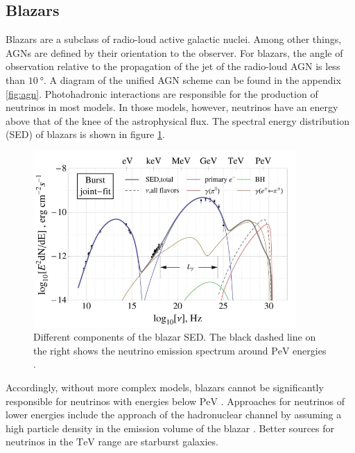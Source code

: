 \subsection{Blazars}
Blazars are a subclass of radio-loud active galactic nuclei.
Among other things, AGNs are defined by their orientation to the observer.
For blazars, the angle of observation relative to the propagation of the jet of the radio-loud AGN is less than $\SI{10}{\degree}$.
A diagram of the unified AGN scheme can be found in the appendix \ref{fig:agn}.
Photohadronic interactions are responsible for the production of neutrinos in most models.
In those models, however, neutrinos have an energy above that of the knee of the astrophysical flux.
The spectral energy distribution (SED) of blazars is shown in figure \ref{fig:sed}.
\begin{figure}
    \centering
    \includegraphics[width=10cm]{Plots/01_5_astroparticle/sed.jpeg}
    \caption{Different components of the blazar SED. The black dashed line on the right shows the neutrino emission spectrum around $\si{\peta\electronvolt}$ energies \cite{sed}.}
    \label{fig:sed}
\end{figure}
Accordingly, without more complex models, blazars cannot be significantly responsible for neutrinos with energies below $\si{\peta\electronvolt}$ \cite{blazar}.
Approaches for neutrinos of lower energies include the approach of the hadronuclear channel by assuming a high particle density in the emission volume of the blazar \cite{eichmann}.
Better sources for neutrinos in the $\si{\tera\electronvolt}$ range are starburst galaxies.

